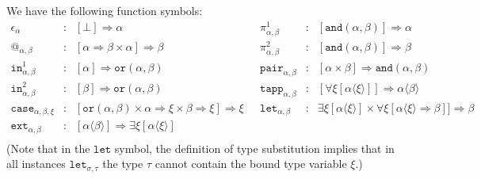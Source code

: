 \documentclass[runningheads,a4paper]{llncs}
\newcommand{\quant}[2]{\forall #1[#2]}
\newcommand{\qquant}[3]{#1 #2[#3]}
\newcommand{\arrtype}{\Rightarrow}
\newcommand{\meta}[2]{#1\langle#2\rangle}
\begin{document}
We have the following function symbols:
\[
\begin{array}{rclrcl}
\epsilon_\alpha & : & [\bot] \arrtype \alpha &
\pi^1_{\alpha,\beta} & : & [\mathtt{and}(\alpha,\beta)] \arrtype \alpha \\
@_{\alpha,\beta} & : & [\alpha \arrtype \beta \times \alpha] \arrtype \beta &
\pi^2_{\alpha,\beta} & : & [\mathtt{and}(\alpha,\beta)] \arrtype \beta \\
\mathtt{in}^1_{\alpha,\beta} & : & [\alpha] \arrtype
  \mathtt{or}(\alpha,\beta) &
\mathtt{pair}_{\alpha,\beta} & : & [\alpha \times \beta] \arrtype
  \mathtt{and}(\alpha,\beta) \\
\mathtt{in}^2_{\alpha,\beta} & : & [\beta] \arrtype
  \mathtt{or}(\alpha,\beta) &
\mathtt{tapp}_{\alpha,\beta} & : &
  [\quant{\xi}{\meta{\alpha}{\xi}}] \arrtype \meta{\alpha}{\beta} \\
\mathtt{case}_{\alpha,\beta,\xi} & : & [\mathtt{or}(\alpha,\beta) \times
  \alpha \arrtype \xi \times \beta \arrtype \xi] \arrtype \xi\ \ \ & 
\mathtt{let}_{\alpha,\beta} & : &
  \qquant{\exists}{\xi}{\meta{\alpha}{\xi}} \times 
  \quant{\xi}{\alpha\langle\xi\rangle \arrtype \beta}] \arrtype \beta \\
\mathtt{ext}_{\alpha,\beta} & : & [\meta{\alpha}{\beta}] \arrtype
  \qquant{\exists}{\xi}{\meta{\alpha}{\xi}} \\
\end{array}
\]
(Note that in the $\mathtt{let}$ symbol, the definition of type
substitution implies that in all instances $\mathtt{let}_{\sigma,\tau}$
the type $\tau$ cannot contain the bound type variable $\xi$.)
\end{document}
